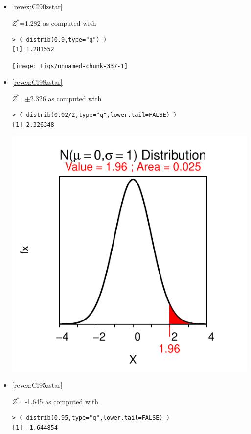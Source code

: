 \documentclass[10pt,openany]{book}\usepackage[]{graphicx}\usepackage[]{color}
\makeatletter
\newenvironment{kframe}{%
 \def\at@end@of@kframe{}%
 \ifinner\ifhmode%
  \def\at@end@of@kframe{\end{minipage}}%
  \begin{minipage}{\columnwidth}%
 \fi\fi%
 \def\FrameCommand##1{\hskip\@totalleftmargin \hskip-\fboxsep
 \colorbox{shadecolor}{##1}\hskip-\fboxsep
     \hskip-\linewidth \hskip-\@totalleftmargin \hskip\columnwidth}%
 \MakeFramed {\advance\hsize-\width
   \@totalleftmargin\z@ \linewidth\hsize
   \@setminipage}}%
 {\par\unskip\endMakeFramed%
 \at@end@of@kframe}
\newenvironment{knitrout}{}{} %
\makeatother
\begin{document}
\begin{itemize}
\begin{knitrout}
{}



\end{knitrout}
  \item \hypertarget{ans:CI90zstar}{\ref{revex:CI90zstar}} $Z^{*}$=1.282 as computed with
\begin{knitrout}
\color{fgcolor}\begin{kframe}
\begin{verbatim}
> ( distrib(0.9,type="q") )
[1] 1.281552
\end{verbatim}
\end{kframe}

{\centering \texttt{[image: Figs/unnamed-chunk-337-1]} 

}



\end{knitrout}
  \item \hypertarget{ans:CI98zstar}{\ref{revex:CI98zstar}} $Z^{*}$=$\pm$2.326 as computed with
\begin{knitrout}
\color{fgcolor}\begin{kframe}
\begin{verbatim}
> ( distrib(0.02/2,type="q",lower.tail=FALSE) )
[1] 2.326348
\end{verbatim}
\end{kframe}

{\centering \includegraphics[width=.4\linewidth]{Figs/unnamed-chunk-338-1} 

}



\end{knitrout}
  \item \hypertarget{ans:CI95zstar}{\ref{revex:CI95zstar}} $Z^{*}$=-1.645 as computed with
\begin{knitrout}
\color{fgcolor}\begin{kframe}
\begin{verbatim}
> ( distrib(0.95,type="q",lower.tail=FALSE) )
[1] -1.644854
\end{verbatim}
\end{kframe}


\end{knitrout}
\end{itemize}
\end{document}
